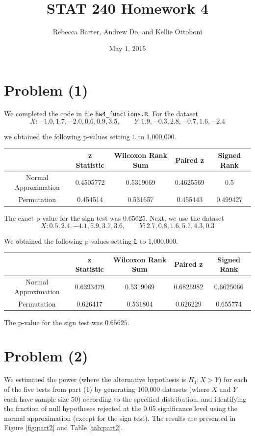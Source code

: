 \documentclass[11pt]{article}
\title{STAT 240 Homework 4}
\author{Rebecca Barter, Andrew Do, and Kellie Ottoboni}
\date{May 1, 2015} %
\begin{document}
\maketitle


\section*{Problem (1)}
We completed the code in file \texttt{hw4\_functions.R}.  For the dataset 
$$X: -1.0, 1.7, -2.0, 0.6, 0.9, 3.5, \qquad Y : 1.9, -0.3, 2.8, -0.7, 1.6, -2.4$$

we obtained the following p-values setting $\texttt{L}$ to 1,000,000.
\begin{table}[htdp]
\begin{center}
\begin{tabular}{|c|c|c|c|c|}
\hline
 & z Statistic & Wilcoxon Rank Sum & Paired z & Signed Rank  \\ \hline
Normal Approximation & 0.4505772 & 0.5319069 & 0.4625569 & 0.5   \\
Permutation & 0.454514 & 0.531657 & 0.455443 & 0.499427  \\ \hline
\end{tabular}
\end{center}
\label{default}
\end{table}%
 The exact p-value for the sign test was $0.65625$.  Next, we use the dataset 
$$X: 0.5, 2.4, -4.1, 5.9, 3.7, 3.6, \qquad Y : 2.7, 0.8, 1.6, 5.7, 4.3, 0.3$$

We obtained the following p-values setting $\texttt{L}$ to 1,000,000.
\begin{table}[htdp]
\begin{center}
\begin{tabular}{|c|c|c|c|c|}
\hline
 & z Statistic & Wilcoxon Rank Sum & Paired z & Signed Rank  \\ \hline
Normal Approximation & 0.6393479 & 0.5319069 & 0.6826982 & 0.6625066   \\
Permutation & 0.626417 &  0.531804 & 0.626229 & 0.655774  \\ \hline
\end{tabular}
\end{center}
\label{default}
\end{table}%

The p-value for the sign test was $ 0.65625$.

\newpage
\section*{Problem (2)}
We estimated the power (where the alternative hypothesis is $H_1: X > Y$) for each of the five tests from part (1) by generating 100,000 datasets (where $X$ and $Y$ each have sample size 50) according to the specified distribution, and identifying the fraction of null hypotheses rejected at the 0.05 significance level using the normal approximation (except for the sign test). The results are presented in Figure \ref{fig:part2} and Table \ref{tab:part2}.
\end{document}
